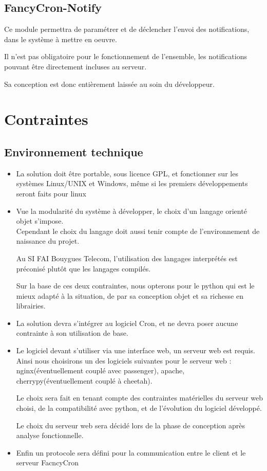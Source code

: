 \documentclass{bouygues-fr}
\begin{document}
\subsection{FancyCron-Notify}
Ce module permettra de paramétrer et de déclencher l'envoi des notifications, dans le système à mettre en oeuvre.

Il n'est pas obligatoire pour le fonctionnement de l'ensemble, les notifications pouvant être directement incluses au serveur.

Sa conception est donc entièrement laissée au soin du développeur.


\vspace{20pt}
\section{Contraintes}

\subsection{Environnement technique}

\begin{itemize}
\item La solution doit être portable, sous licence GPL, et fonctionner sur les systèmes Linux/UNIX et Windows, même si les premiers développements seront faits pour linux
\item Vue la modularité du système à développer, le choix d'un langage orienté objet s'impose.\\
Cependant le choix du langage doit aussi tenir compte de l'environnement de naissance du projet.

 Au SI FAI Bouygues Telecom, l'utilisation des langages interprétés est préconisé plutôt que les langages compilés.

Sur la base de ces deux contraintes, nous opterons pour le python qui est le mieux adapté à la situation,  de par sa conception objet et sa richesse en librairies.
\item La solution devra s'intégrer au logiciel Cron, et ne devra poser aucune contrainte à son utilisation de base.
\item Le logiciel devant s'utiliser via une interface web, un serveur web est requis.\\
Ainsi nous choisirons un des logiciels suivantes pour le serveur web : nginx(éventuellement couplé avec passenger), apache, cherrypy(éventuellement couplé à cheetah).

Le choix sera fait en tenant compte des contraintes matérielles du serveur web choisi, de la compatibilité avec python, et de l'évolution du logiciel développé.

Le choix du serveur web sera décidé lors de la phase de conception après analyse fonctionnelle.
\item Enfin un protocole sera défini pour la communication entre le client et le serveur FacncyCron
\end{itemize}
\end{document}
